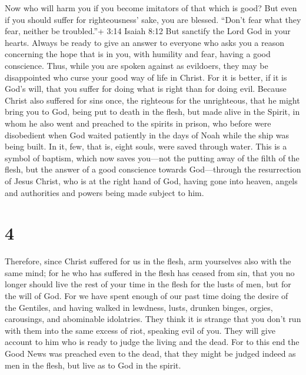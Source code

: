  Now who will harm you if you become imitators of that
which is good?  But even if you should suffer for
righteousness' sake, you are blessed. ``Don't fear what they fear,
neither be troubled.''+ 3:14 Isaiah 8:12  But sanctify the
Lord God in your hearts. Always be ready to give an answer to everyone
who asks you a reason concerning the hope that is in you, with humility
and fear,  having a good conscience. Thus, while you are
spoken against as evildoers, they may be disappointed who curse your
good way of life in Christ.  For it is better, if it is
God's will, that you suffer for doing what is right than for doing evil.
 Because Christ also suffered for sins once, the righteous
for the unrighteous, that he might bring you to God, being put to death
in the flesh, but made alive in the Spirit,  in whom he
also went and preached to the spirits in prison,  who
before were disobedient when God waited patiently in the days of Noah
while the ship was being built. In it, few, that is, eight souls, were
saved through water.  This is a symbol of baptism, which
now saves you---not the putting away of the filth of the flesh, but the
answer of a good conscience towards God---through the resurrection of
Jesus Christ,  who is at the right hand of God, having gone
into heaven, angels and authorities and powers being made subject to
him.

\hypertarget{section-3}{%
\section{4}\label{section-3}}

 Therefore, since Christ suffered for us in the flesh, arm
yourselves also with the same mind; for he who has suffered in the flesh
has ceased from sin,  that you no longer should live the
rest of your time in the flesh for the lusts of men, but for the will of
God.  For we have spent enough of our past time doing the
desire of the Gentiles, and having walked in lewdness, lusts, drunken
binges, orgies, carousings, and abominable idolatries.  They
think it is strange that you don't run with them into the same excess of
riot, speaking evil of you.  They will give account to him
who is ready to judge the living and the dead.  For to this
end the Good News was preached even to the dead, that they might be
judged indeed as men in the flesh, but live as to God in the spirit.

